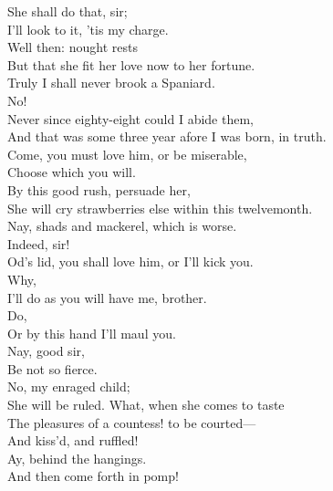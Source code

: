 \documentclass[a4paper,oneside]{memoir}
\begin{document}
\begin{drama*}
\kastrilspeaks {} She shall do that, sir;\\
I'll look to it, 'tis my charge.\\
\subtlespeaks {} Well then: nought rests\\
But that she fit her love now to her fortune.\\
\pliantspeaks Truly I shall never brook a Spaniard.\\
\subtlespeaks No!\\
\pliantspeaks {} Never since eighty-eight could I abide them,\\
And that was some three year afore I was born, in truth.\\
\subtlespeaks Come, you must love him, or be miserable,\\
Choose which you will.\\
\facespeaks {} By this good rush, persuade her,\\
She will cry strawberries else within this twelvemonth.\\
\subtlespeaks Nay, shads and mackerel, which is worse.\\
\facespeaks {} Indeed, sir!\\
\kastrilspeaks Od's lid, you shall love him, or I'll kick you.\\
\pliantspeaks {} Why,\\
I'll do as you will have me, brother.\\
\kastrilspeaks {} Do,\\
Or by this hand I'll maul you.\\
\facespeaks {} Nay, good sir,\\
Be not so fierce.\\
\subtlespeaks {} No, my enraged child;\\
She will be ruled. What, when she comes to taste\\
The pleasures of a countess! to be courted---\\
\facespeaks And kiss'd, and ruffled!\\
\subtlespeaks {} Ay, behind the hangings.\\
\facespeaks And then come forth in pomp!\\

\end{drama*}
\end{document}
